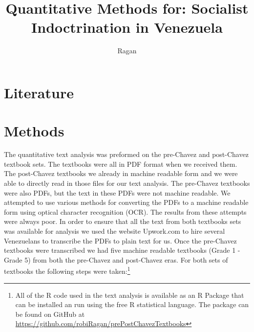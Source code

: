 \documentclass[12]{article}
\title{Quantitative Methods for: Socialist Indoctrination in Venezuela}
\author{Ragan}
\begin{document}
\maketitle

\doublespace

\section{Literature}



\section{Methods}
The quantitative text analysis was preformed on the pre-Chavez and post-Chavez textbook sets. The textbooks were all in PDF format when we received them. The post-Chavez textbooks we already in machine readable form and we were able to directly read in those files for our text analysis. The pre-Chavez textbooks were also PDFs, but the text in these PDFs were not machine readable. We attempted to use various methods for converting the PDFs to a machine readable form using optical character recognition (OCR). The results from these attempts were always poor. In order to ensure that all the text from both textbooks sets was available for analysis we used the website Upwork.com to hire several Venezuelans to transcribe the PDFs to plain text for us. Once the pre-Chavez textbooks were transcribed we had five machine readable textbooks (Grade 1 - Grade 5) from both the pre-Chavez and post-Chavez eras. For both sets of textbooks the following steps were taken:\footnote{All of the R code used in the text analysis is available as an R Package that can be installed an run using the free R statistical language. The package can be found on GitHub at \url{https://github.com/robiRagan/prePostChavezTextbooks}}
\end{document}
